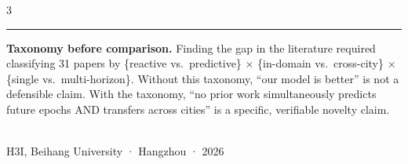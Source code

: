 \documentclass[20pt]{extarticle}
\newcommand{\posec}[1]{\vspace{4pt}{\large\bfseries\color{buaaNavy}#1}\\[-4pt]
  {\color{buaaBlue}\rule{\linewidth}{1.5pt}}\vspace{4pt}}
\begin{document}
\begin{multicols}{3}
\posec{Key Lesson}
\begin{poblock}
\textbf{Taxonomy before comparison.}
Finding the gap in the literature required classifying 31 papers by
\{reactive vs.\ predictive\} $\times$ \{in-domain vs.\ cross-city\} $\times$ \{single vs.\ multi-horizon\}.
Without this taxonomy, ``our model is better'' is not a defensible claim.
With the taxonomy, ``no prior work simultaneously predicts future epochs AND
transfers across cities'' is a specific, verifiable novelty claim.
\end{poblock}

\end{multicols}

\noindent{\color{buaaBlue}\rule{\linewidth}{1.5pt}}\\[2pt]
{\small\color{buaaNavy}\centering H3I, Beihang University · Hangzhou · 2026}
\end{document}
